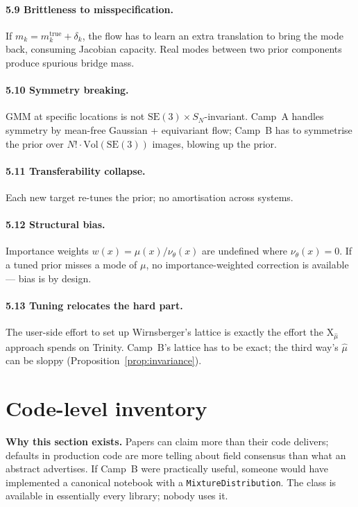 \documentclass[11pt,letterpaper]{article}
\newcommand{\Xfun}{\mathrm{X}}
\theoremstyle{plain}
\begin{document}
\paragraph{5.9 Brittleness to misspecification.} If $m_k=m_k^{\mathrm{true}}+\delta_k$,
the flow has to learn an extra translation to bring the mode back, consuming
Jacobian capacity. Real modes between two prior components produce spurious
bridge mass.

\paragraph{5.10 Symmetry breaking.} GMM at specific locations is not
$\mathrm{SE}(3)\times S_N$-invariant. Camp~A handles symmetry by mean-free
Gaussian + equivariant flow; Camp~B has to symmetrise the prior over
$N!\cdot\mathrm{Vol}(\mathrm{SE}(3))$ images, blowing up the prior.

\paragraph{5.11 Transferability collapse.} Each new target re-tunes the prior;
no amortisation across systems.

\paragraph{5.12 Structural bias.} Importance weights $w(x)=\mu(x)/\nu_\theta(x)$
are undefined where $\nu_\theta(x)=0$. If a tuned prior misses a mode of $\mu$,
no importance-weighted correction is available --- bias is by design.

\paragraph{5.13 Tuning relocates the hard part.} The user-side effort to set up
Wirnsberger's lattice is exactly the effort the $\Xfun_{\hat\mu}$ approach spends
on Trinity. Camp~B's lattice has to be exact; the third way's $\hat\mu$ can be
sloppy (Proposition~\ref{prop:invariance}).

\section{Code-level inventory}

\begin{callout}
\textbf{Why this section exists.} Papers can claim more than their code delivers;
defaults in production code are more telling about field consensus than what an
abstract advertises. If Camp~B were practically useful, someone would have
implemented a canonical notebook with a \texttt{MixtureDistribution}. The class
is available in essentially every library; nobody uses it.
\end{callout}
\end{document}
